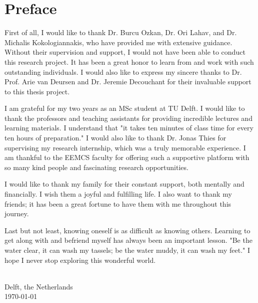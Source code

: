 \chapter{\label{cha:Preface}Preface}

First of all, I would like to thank Dr. Burcu Ozkan, Dr. Ori Lahav, and Dr. Michalis Kokologiannakis, who have provided me with extensive guidance. Without their supervision and support, I would not have been able to conduct this research project. It has been a great honor to learn from and work with such outstanding individuals. I would also like to express my sincere thanks to Dr. Prof. Arie van Deursen and Dr. Jeremie Decouchant for their invaluable support to this thesis project.

I am grateful for my two years as an MSc student at TU Delft. I would like to thank the professors and teaching assistants for providing incredible lectures and learning materials. I understand that "it takes ten minutes of class time for every ten hours of preparation." I would also like to thank Dr. Jonas Thies for supervising my research internship, which was a truly memorable experience. I am thankful to the EEMCS faculty for offering such a supportive platform with so many kind people and fascinating research opportunities.

I would like to thank my family for their constant support, both mentally and financially. I wish them a joyful and fulfilling life. I also want to thank my friends; it has been a great fortune to have them with me throughout this journey.

Last but not least, knowing oneself is as difficult as knowing others. Learning to get along with and befriend myself has always been an important lesson. "Be the water clear, it can wash my tassels; be the water muddy, it can wash my feet." I hope I never stop exploring this wonderful world.





\vskip1cm
\begin{flushright}
	\theauthor\\
	Delft, the Netherlands \\
	\today\\
\end{flushright}

